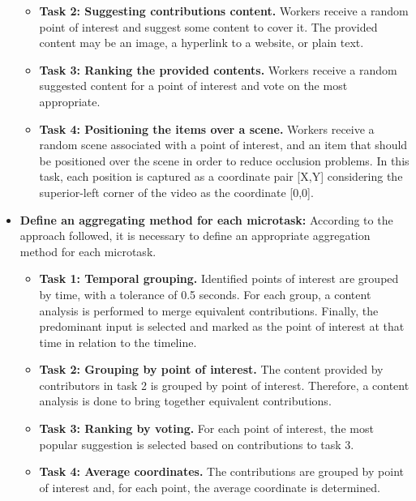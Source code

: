 \begin{itemize}
\begin{itemize}
\item \textbf{Task 2: Suggesting contributions content.} Workers receive a random point of interest and suggest some content to cover it. The provided content may be an image, a hyperlink to a website, or plain text.	

\item \textbf{Task 3: Ranking the provided contents.} Workers receive a random suggested content for a point of interest and vote on the most appropriate.
	
\item \textbf{Task 4: Positioning the items over a scene.} 
Workers receive a random scene associated with a point of interest, and an item that should be positioned over the scene in order to reduce occlusion problems. In this task, each position is captured as a coordinate pair [X,Y] considering the superior-left corner of the video as the coordinate [0,0].

\end{itemize}

\item \textbf{Define an aggregating method for each microtask:} \linebreak  
According to the approach followed, it is necessary to define an appropriate aggregation method for each microtask.

\begin{itemize}
\item \textbf{Task 1: Temporal grouping.} Identified points of interest are grouped by time, with a tolerance of 0.5 seconds. For each group, a content analysis is performed to merge equivalent contributions. Finally, the predominant input is selected and marked as the point of interest at that time in relation to the timeline.

\item \textbf{Task 2: Grouping by point of interest.} The content provided by contributors in task 2 is grouped by point of interest. Therefore, a content analysis is done to bring together equivalent contributions.

\item \textbf{Task 3: Ranking by voting.} For each point of interest, the most popular suggestion is selected based on contributions to task 3.
	
\item \textbf{Task 4: Average coordinates.} The contributions are grouped by point of interest and, for each point, the average coordinate is determined.


\end{itemize}
\end{itemize}
